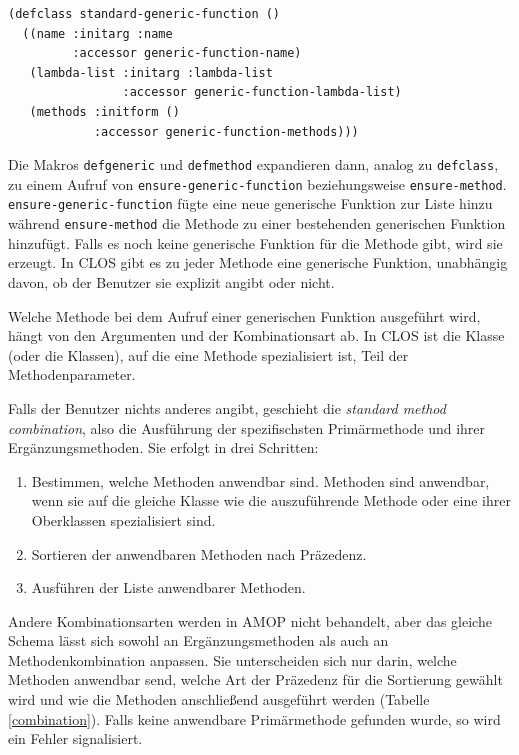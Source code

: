 \begin{lstlisting}
(defclass standard-generic-function ()
  ((name :initarg :name
         :accessor generic-function-name)
   (lambda-list :initarg :lambda-list
                :accessor generic-function-lambda-list)
   (methods :initform ()
            :accessor generic-function-methods)))
\end{lstlisting}

Die Makros \texttt{defgeneric} und \texttt{defmethod} expandieren dann, analog zu \texttt{defclass}, zu einem Aufruf von \texttt{ensure-generic-function} beziehungsweise \texttt{ensure-method}. \texttt{ensure-generic-function} fügte eine neue generische Funktion zur Liste hinzu während \texttt{ensure-method} die Methode zu einer bestehenden generischen Funktion hinzufügt. Falls es noch keine generische Funktion für die Methode gibt, wird sie erzeugt. In CLOS gibt es zu jeder Methode eine generische Funktion, unabhängig davon, ob der Benutzer sie explizit angibt oder nicht.

Welche Methode bei dem Aufruf einer generischen Funktion ausgeführt wird, hängt von den Argumenten und der Kombinationsart ab. In CLOS ist die Klasse (oder die Klassen), auf die eine Methode spezialisiert ist, Teil der Methodenparameter. 

Falls der Benutzer nichts anderes angibt, geschieht die \emph{standard method combination}, also die Ausführung der spezifischsten Primärmethode und ihrer Ergänzungsmethoden. Sie erfolgt in drei Schritten:
\begin{enumerate}
 \item Bestimmen, welche Methoden anwendbar sind. Methoden sind anwendbar, wenn sie auf die gleiche Klasse wie die auszuführende Methode oder eine ihrer Oberklassen spezialisiert sind.
 \item Sortieren der anwendbaren Methoden nach Präzedenz.
 \item Ausführen der Liste anwendbarer Methoden.
\end{enumerate}

Andere Kombinationsarten werden in AMOP nicht behandelt, aber das gleiche Schema lässt sich sowohl an Ergänzungsmethoden als auch an Methodenkombination anpassen. Sie unterscheiden sich nur darin, welche Methoden anwendbar send, welche Art der Präzedenz für die Sortierung gewählt wird und wie die Methoden anschließend ausgeführt werden (Tabelle \ref{combination}). Falls keine anwendbare Primärmethode gefunden wurde, so wird ein Fehler signalisiert.

